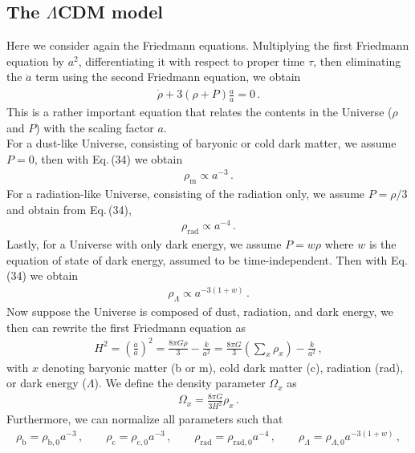 \documentclass[11pt]{article}
\theoremstyle{break}
\theoremstyle{break}
\begin{document}
\subsection{The $\Lambda$CDM model}
Here we consider again the Friedmann equations. Multiplying the first Friedmann equation by $a^2$, differentiating it with respect to proper time $\tau$, then eliminating the $\ddot{a}$ term using the second Friedmann equation, we obtain
\begin{align}
\dot{\rho} + 3(\rho +P) \frac{\dot{a}}{a} = 0\,.
\end{align}
This is a rather important equation that relates the contents in the Universe ($\rho$ and $P$) with the scaling factor $a$. \\

For a dust-like Universe, consisting of baryonic or cold dark matter, we assume $P = 0$, then with Eq.\,(34) we obtain
\begin{align}
\rho_{\text{m}} \propto a^{-3}\,.
\end{align}
For a radiation-like Universe, consisting of the radiation only, we assume $P = \rho/3$ and obtain from Eq.\,(34), 
\begin{align}
\rho_{\text{rad}} \propto a^{-4}\,.
\end{align}
Lastly, for a Universe with only dark energy, we assume $P = w\rho$ where $w$ is the equation of state of dark energy, assumed to be time-independent. Then with Eq.\,(34) we obtain
\begin{align}
\rho_{\Lambda} \propto a^{-3(1+w)}\,.
\end{align}
Now suppose the Universe is composed of dust, radiation, and dark energy, we then can rewrite the first Friedmann equation as
\begin{align}
H^2 = \left( \frac{\dot{a}}{a}\right)^2 = \frac{8\pi G\rho}{3} - \frac{k}{a^2} = \frac{8\pi G}{3}\left( \sum_x \rho_x \right)  - \frac{k}{a^2}\,,
\end{align}
with $x$ denoting baryonic matter (b or m), cold dark matter (c), radiation (rad), or dark energy ($\Lambda$). We define the density parameter $\Omega_x$ as
\begin{align}
\Omega_x  = \frac{8\pi G}{3H^2}\rho_x\,.
\end{align}
Furthermore, we can normalize all parameters such that 
\begin{align}
\rho_\text{b} = \rho_{\text{b},0}a^{-3}\,,\qquad
\rho_\text{c} = \rho_{\text{c},0}a^{-3}\,,\qquad
\rho_{\text{rad}} = \rho_{\text{rad},0}a^{-4}\,,\qquad
\rho_\Lambda = \rho_{\Lambda, 0}a^{-3(1+w)}\,,
\end{align}
\end{document}
